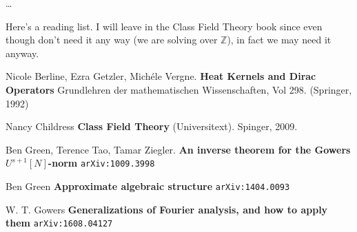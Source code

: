\documentclass[12pt]{article}
\begin{document}
\noindent \dots 

\vfill


\noindent Here's a reading list. I will leave in the Class Field Theory book since even though don't need it any way (we are solving over $\mathbb{Z}$), in fact we may need it anyway.

\begin{thebibliography}{}

\item Nicole Berline, Ezra Getzler, Mich\'{e}le Vergne. \textbf{Heat Kernels and Dirac Operators} Grundlehren der mathematischen Wissenschaften, Vol 298. (Springer, 1992)

\item Nancy Childress \textbf{Class Field Theory} (Universitext).  Spinger, 2009.

\item Ben Green, Terence Tao, Tamar Ziegler. \textbf{An inverse theorem for the Gowers $U^{s+1}[N]$-norm} \texttt{arXiv:1009.3998}

\item Ben Green \textbf{Approximate algebraic structure} \texttt{arXiv:1404.0093}

\item W. T. Gowers \textbf{Generalizations of Fourier analysis, and how to apply them} \texttt{arXiv:1608.04127}

\end{thebibliography}

\end{document}
